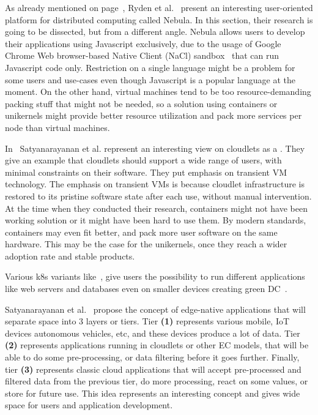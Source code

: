 As already mentioned on page~\pageref{sec:rayden}, Ryden et al.~\cite{RydenOCW14} present an interesting user-oriented platform for distributed computing called Nebula. In this section, their research is going to be dissected, but from a different angle. Nebula allows users to develop their applications using Javascript exclusively, due to the usage of Google Chrome Web browser-based Native Client (NaCl) sandbox~\cite{YeeSDCMOONF10} that can run Javascript code only. Restriction on a single language might be a problem for some users and use-cases even though Javascript is a popular language at the moment. On the other hand, virtual machines tend to be too resource-demanding packing stuff that might not be needed, so a solution using containers or unikernels might provide better resource utilization and pack more services per node than virtual machines.

In~\cite{SatyanarayananBCD09} Satyanarayanan et al. represent an interesting view on cloudlets as a . They give an example that cloudlets should support a wide range of users, with minimal constraints on their software. They put emphasis on transient VM technology. The emphasis on transient VMs is because cloudlet infrastructure is restored to its pristine software state after each use, without manual intervention. At the time when they conducted their research, containers might not have been working solution or it might have been hard to use them. By modern standards, containers may even fit better, and pack more user software on the same hardware. This may be the case for the unikernels, once they reach a wider adoption rate and stable products.

Various k8s variants like~\cite{KubeEdge, RossiCPN20}, give users the possibility to run different applications like web servers and databases even on smaller devices creating green DC~\cite{ArocaG12}.

Satyanarayanan et al.~\cite{SatyanarayananK19} propose the concept of edge-native applications that will separate space into 3 layers or tiers. Tier \textbf{(1)} represents various mobile, IoT devices autonomous vehicles, etc, and these devices produce a lot of data. Tier \textbf{(2)} represents applications running in cloudlets or other EC models, that will be able to do some pre-processing, or data filtering before it goes further. Finally, tier \textbf{(3)} represents classic cloud applications that will accept pre-processed and filtered data from the previous tier, do more processing, react on some values, or store for future use. This idea represents an interesting concept and gives wide space for users and application development.

